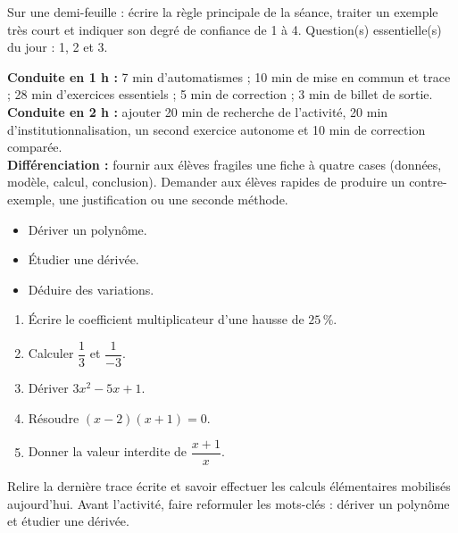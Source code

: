 \begin{sortie}Sur une demi-feuille : écrire la règle principale de la séance, traiter un exemple très court et indiquer son degré de confiance de 1 à 4. Question(s) essentielle(s) du jour : 1, 2 et 3.\end{sortie}

\ifprof
\begin{methode}
\textbf{Conduite en 1 h :} 7 min d'automatismes ; 10 min de mise en commun et trace ; 28 min d'exercices essentiels ; 5 min de correction ; 3 min de billet de sortie.\\
\textbf{Conduite en 2 h :} ajouter 20 min de recherche de l'activité, 20 min d'institutionnalisation, un second exercice autonome et 10 min de correction comparée.\\
\textbf{Différenciation :} fournir aux élèves fragiles une fiche à quatre cases (données, modèle, calcul, conclusion). Demander aux élèves rapides de produire un contre-exemple, une justification ou une seconde méthode.
\end{methode}
\fi
{}
\begin{objectifs}\begin{itemize}\item Dériver un polynôme.\item Étudier une dérivée.\item Déduire des variations.\end{itemize}\end{objectifs}
\begin{automatismes}\begin{enumerate}\item Écrire le coefficient multiplicateur d'une hausse de $25\,\%$. \item Calculer $\dfrac1{3}$ et $\dfrac1{-3}$. \item Dériver $3x^2-5x+1$. \item Résoudre $(x-2)(x+1)=0$. \item Donner la valeur interdite de $\dfrac{x+1}{x}$. \end{enumerate}\end{automatismes}
\begin{prerequis}Relire la dernière trace écrite et savoir effectuer les calculs élémentaires mobilisés aujourd'hui. Avant l'activité, faire reformuler les mots-clés : dériver un polynôme et étudier une dérivée.\end{prerequis}

